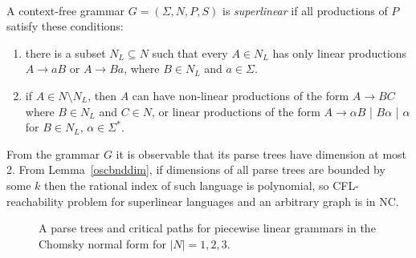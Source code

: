 \begin{example}
\\
A context-free grammar $G = (\Sigma, N, P, S)$ is \textit{superlinear} if all productions of $P$ satisfy these conditions:
\begin{enumerate}
\item there is a subset $N_L \subseteq N$ such that every $A \in N_L$ has only linear productions $A\rightarrow aB$ or $A\rightarrow Ba$, where $B \in N_L$ and $a \in \Sigma$.
\item if $A \in N \setminus N_L$, then $A$ can have non-linear productions of the form $A \rightarrow BC$ where $B\in N_L$ and $C \in N$, or linear productions of the form $A\rightarrow \alpha B$ | $B \alpha$ | $\alpha$ for $B \in N_L$, $\alpha \in \Sigma^*$.
\end{enumerate}
From the grammar $G$ it is observable that its parse trees have dimension at most 2. From 
Lemma~\ref{oscbnddim}, if dimensions of all parse trees are bounded by some $k$ then the rational index of such language is polynomial, so CFL-reachability problem for superlinear languages and an arbitrary graph is in NC. 
\end{example}
\begin{figure}
\caption{A parse trees and critical paths for piecewise linear grammars in the Chomsky normal form for $|N| = 1, 2, 3$.}
\label{crit}      
\end{figure}
